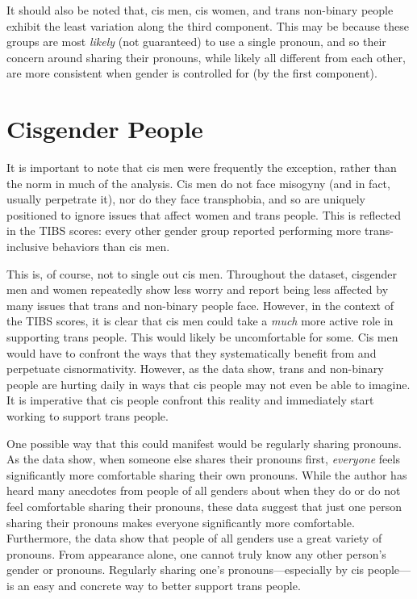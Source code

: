 \documentclass[12pt,twoside]{reedthesis}
\begin{document}
It should also be noted that, cis men, cis women, and trans non-binary people exhibit the least variation along the third component. This may be because these groups are most \emph{likely} (not guaranteed) to use a single pronoun, and so their concern around sharing their pronouns, while likely all different from each other, are more consistent when gender is controlled for (by the first component).

\hypertarget{cisgender-people}{%
\section{Cisgender People}\label{cisgender-people}}

It is important to note that cis men were frequently the exception, rather than the norm in much of the analysis. Cis men do not face misogyny (and in fact, usually perpetrate it), nor do they face transphobia, and so are uniquely positioned to ignore issues that affect women and trans people. This is reflected in the TIBS scores: every other gender group reported performing more trans-inclusive behaviors than cis men.

This is, of course, not to single out cis men. Throughout the dataset, cisgender men and women repeatedly show less worry and report being less affected by many issues that trans and non-binary people face. However, in the context of the TIBS scores, it is clear that cis men could take a \emph{much} more active role in supporting trans people. This would likely be uncomfortable for some. Cis men would have to confront the ways that they systematically benefit from and perpetuate cisnormativity. However, as the data show, trans and non-binary people are hurting daily in ways that cis people may not even be able to imagine. It is imperative that cis people confront this reality and immediately start working to support trans people.

One possible way that this could manifest would be regularly sharing pronouns. As the data show, when someone else shares their pronouns first, \emph{everyone} feels significantly more comfortable sharing their own pronouns. While the author has heard many anecdotes from people of all genders about when they do or do not feel comfortable sharing their pronouns, these data suggest that just one person sharing their pronouns makes everyone significantly more comfortable. Furthermore, the data show that people of all genders use a great variety of pronouns. From appearance alone, one cannot truly know any other person's gender or pronouns. Regularly sharing one's pronouns---especially by cis people---is an easy and concrete way to better support trans people.
\end{document}
